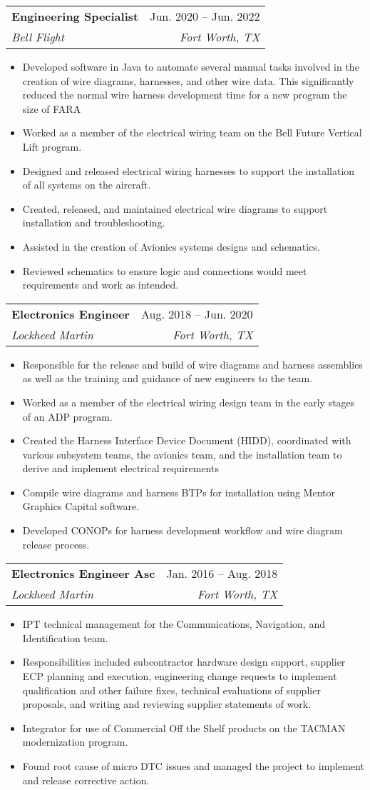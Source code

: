 \documentclass[letterpaper,11pt]{article}
\makeatletter
\newcommand{\resumeItem}[1]{
  \item\small{
    {#1 \vspace{-2pt}}
  }
}
\newcommand{\resumeSubheading}[4]{
  \vspace{-2pt}\item
    \begin{tabular*}{0.97\textwidth}[t]{l@{\extracolsep{\fill}}r}
      \textbf{#1} & #2 \\
      \textit{\small#3} & \textit{\small #4} \\
    \end{tabular*}\vspace{-7pt}
}
\newcommand{\resumeItemListStart}{\begin{itemize}}
\newcommand{\resumeItemListEnd}{\end{itemize}\vspace{-5pt}}
\makeatother
\begin{document}

    \resumeSubheading
      {Engineering Specialist}{Jun. 2020 -- Jun. 2022}
      {Bell Flight}{Fort Worth, TX}
      \resumeItemListStart
        \resumeItem{Developed software in Java to automate several manual tasks involved in the creation of wire diagrams, harnesses, and other wire data. This significantly reduced the normal wire harness development time for a new program the size of FARA}
        \resumeItem{Worked as a member of the electrical wiring team on the Bell Future Vertical Lift program.}
        \resumeItem{Designed and released electrical wiring harnesses to support the installation of all systems on the aircraft. }
        \resumeItem{Created, released, and maintained electrical wire diagrams to support installation and troubleshooting. }
        \resumeItem{Assisted in the creation of Avionics systems designs and schematics.}
        \resumeItem{Reviewed schematics to ensure logic and connections would meet requirements and work as intended.}
      \resumeItemListEnd

      \resumeSubheading
      {Electronics Engineer}{Aug. 2018 -- Jun. 2020}
      {Lockheed Martin}{Fort Worth, TX}
      \resumeItemListStart
        \resumeItem{Responsible for the release and build of wire diagrams and harness assemblies as well as the training and guidance of new engineers to the team.}
        \resumeItem{Worked as a member of the electrical wiring design team in the early stages of an ADP program.}
        \resumeItem{Created the Harness Interface Device Document (HIDD), coordinated with various subsystem teams, the avionics team, and the installation team to derive and implement electrical requirements}
        \resumeItem{Compile wire diagrams and harness BTPs for installation using Mentor Graphics Capital software.}
        \resumeItem{Developed CONOPs for harness development workflow and wire diagram release process.}
      \resumeItemListEnd

      \resumeSubheading
      {Electronics Engineer Asc}{Jan. 2016 -- Aug. 2018}
      {Lockheed Martin}{Fort Worth, TX}
      \resumeItemListStart
        \resumeItem{IPT technical management for the Communications, Navigation, and Identification team. }
        \resumeItem{Responsibilities included subcontractor hardware design support, supplier ECP planning and execution, engineering change requests to implement qualification and other failure fixes, technical evaluations of supplier proposals, and writing and reviewing supplier statements of work.}
        \resumeItem{Integrator for use of Commercial Off the Shelf products on the TACMAN modernization program.}
        \resumeItem{Found root cause of micro DTC issues and managed the project to implement and release corrective action.}
      \resumeItemListEnd
\end{document}
